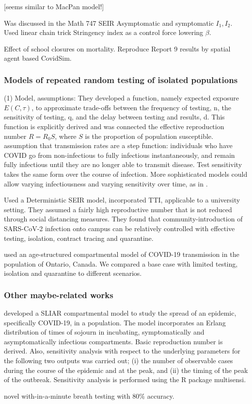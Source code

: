 \documentclass[12pt]{article}
\theoremstyle{definition} %
\begin{document}
\citep{elbanna2020entry} [seems similar to MacPan model!]

\citep{de2020influenza} Was discussed in the Math 747 
SEIR Asymptomatic and symptomatic $I_1, I_2$. Used linear chain trick 
Stringency index as a control force lowering $\beta$.

\citep{rice2020effect} Effect of school closures on mortality. Reproduce Report 9 results by spatial agent based CovidSim. 
\subsubsection{Models of repeated random testing of isolated populations}
\cite{bergstrom2020frequency}
(1) Model, assumptions: They developed a function, namely expected exposure $E(C,\tau)$, to approximate trade-offs between the frequency of testing, n, the sensitivity of testing, q, and the delay between
testing and results, d. This function is explicitly derived and was connected the effective reproduction number $R=R_0 S$, where $S$ is the proportion of population susceptible.
assumption that transmission rates are a step function: individuals who
have COVID go from non-infectious to fully infectious instantaneously,
and remain fully infectious until they are no longer able to transmit disease. Test sensitivity takes the same form over the course of infection.
More sophisticated models could allow varying infectiousness and varying
sensitivity over time, as in 
\citep{larremore2020test}.

\citep{lopman2020model} Used a Deterministic SEIR model, incorporated TTI, applicable to a university setting. They assumed a fairly high reproductive number that is not reduced through social
distancing measures. They found that community-introduction of SARS-CoV-2 infection onto campus can be
relatively controlled with effective testing, isolation, contract tracing and quarantine.

\citep{tuite2020mathematical} used an age-structured compartmental model of COVID-19 transmission in the population of Ontario, Canada. We compared a base case with limited testing, isolation and quarantine to different scenarios. 
\subsubsection{Other maybe-related works}
\citep{arino2020simple} developed a SLIAR compartmental model to study the spread of an epidemic, specifically COVID-19, in a population. The model incorporates an Erlang distribution of times of sojourn in incubating, symptomatically and asymptomatically infectious compartments. Basic reproduction number is derived. Also, sensitivity analysis with respect to the underlying parameters for the following two outputs was carried out; (i) the number of observable cases during the course of the epidemic and at the peak, and (ii) the timing of the peak of the outbreak. Sensitivity analysis is performed using the R package multisensi.

\citep{ruszkiewicz2020diagnosis} novel with-in-a-minute breath testing with 80\% accuracy. 
\end{document}
